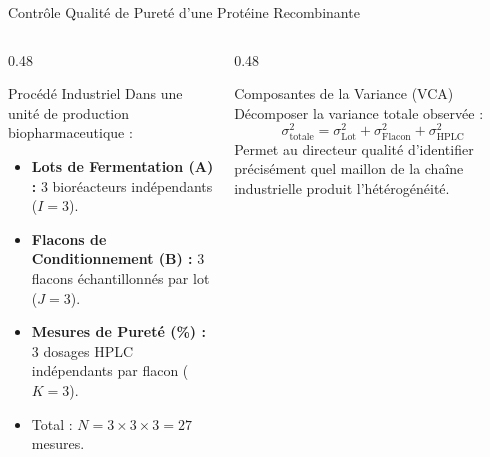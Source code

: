 \documentclass[aspectratio=169,10pt]{beamer}
\begin{document}
\begin{frame}{Contrôle Qualité de Pureté d'une Protéine Recombinante}
  \begin{columns}[onlytextwidth, T]
    \begin{column}{0.48\linewidth}
      \begin{biobox}{Procédé Industriel}
        Dans une unité de production biopharmaceutique :
        \begin{itemize}
          \item \textbf{Lots de Fermentation (A) :} 3 bioréacteurs indépendants ($I = 3$).
          \item \textbf{Flacons de Conditionnement (B) :} 3 flacons échantillonnés par lot ($J = 3$).
          \item \textbf{Mesures de Pureté (\%) :} 3 dosages HPLC indépendants par flacon ($K = 3$).
          \item Total : $N = 3 \times 3 \times 3 = 27$ mesures.
        \end{itemize}
      \end{biobox}
    \end{column}
    \begin{column}{0.48\linewidth}
      \begin{conceptbox}{Composantes de la Variance (VCA)}
        Décomposer la variance totale observée :
        \begin{equation*}
          \sigma^2_{\text{totale}} = \sigma^2_{\text{Lot}} + \sigma^2_{\text{Flacon}} + \sigma^2_{\text{HPLC}}
        \end{equation*}
        Permet au directeur qualité d'identifier précisément quel maillon de la chaîne industrielle produit l'hétérogénéité.
      \end{conceptbox}
    \end{column}
  \end{columns}
\end{frame}
\end{document}
